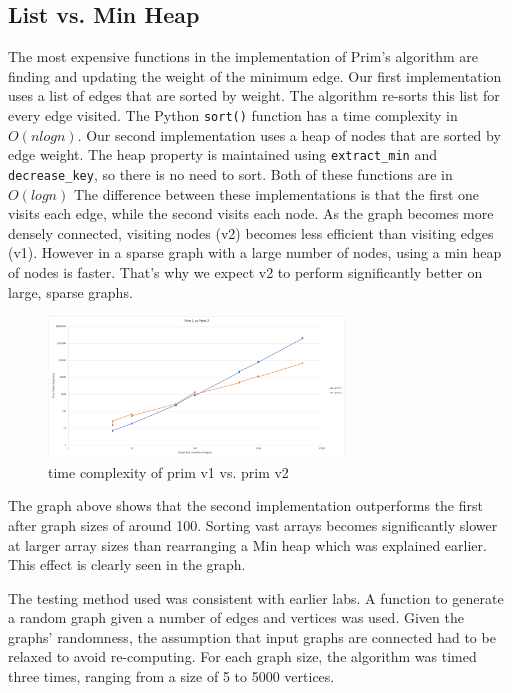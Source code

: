 \documentclass[12pt]{article}
\begin{document}
\subsection{List vs. Min Heap}
The most expensive functions in the implementation of Prim's algorithm are finding and updating the weight of the minimum edge. Our first implementation uses a list of edges that are sorted by weight. The algorithm re-sorts this list for every edge visited. The Python \verb+sort()+ function has a time complexity in $O(nlogn)$. Our second implementation uses a heap of nodes that are sorted by edge weight. The heap property is maintained using \verb+extract_min+ and \verb+decrease_key+, so there is no need to sort. Both of these functions are in $O(logn)$ The difference between these implementations is that the first one visits each edge, while the second visits each node. As the graph becomes more densely connected, visiting nodes (v2) becomes less efficient than visiting edges (v1). However in a sparse graph with a large number of nodes, using a min heap of nodes is faster. That's why we expect v2 to perform significantly better on large, sparse graphs.
\begin{figure}[H]
\centering
\includegraphics[width=0.7\textwidth,height=\textheight,keepaspectratio]{prim1and2.png}
\caption{time complexity of prim v1 vs. prim v2}
\label{Figure: m1}
\end{figure}
\noindent The graph above shows that the second implementation outperforms the first after graph sizes of around 100. Sorting vast arrays becomes significantly slower at larger array sizes than rearranging a Min heap which was explained earlier. This effect is clearly seen in the graph. 

The testing method used was consistent with earlier labs. A function to generate a random graph given a number of edges and vertices was used. Given the graphs' randomness, the assumption that input graphs are connected had to be relaxed to avoid re-computing. For each graph size, the algorithm was timed three times, ranging from a size of 5 to 5000 vertices.
\end{document}

